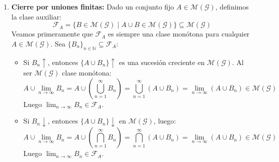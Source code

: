 \begin{demostracion}
\begin{enumerate}
\begin{itemize}
\begin{itemize}
            \item Si $A_n \downarrow$, de manera análoga $\displaystyle \lim_{n \to \infty} A_n = \bigcap_{n=1}^\infty A_n \in \mathcal{M}(\mathcal{G})$, y su complementario $\displaystyle \left( \lim_{n \to \infty} A_n \right)^c = \bigcup_{n=1}^\infty A_n^c = \lim_{n \to \infty} A_n^c \in \mathcal{M}(\mathcal{G})$ (pues $A_n^c \uparrow$ en $\mathcal{M}(\mathcal{G})$). Luego $\lim A_n \in \mathcal{F}$.
        \end{itemize}
    \end{itemize}
    Puesto que $\mathcal{F}$ es una clase monótona que contiene a $\mathcal{G}$, y $\mathcal{M}(\mathcal{G})$ es la minimal entre las clases monótonas que contienen a $\mathcal{G}$, se concluye que $\mathcal{M}(\mathcal{G}) \subseteq \mathcal{F}$. Por ende, $\mathcal{M}(\mathcal{G}) = \mathcal{F}$, lo que demuestra que $\mathcal{M}(\mathcal{G})$ es cerrada por complementarios.

    \item \textbf{Cierre por uniones finitas:}
    Dado un conjunto fijo $A \in \mathcal{M}(\mathcal{G})$, definimos la clase auxiliar:
    \[
        \mathcal{F}_A = \{ B \in \mathcal{M}(\mathcal{G}) \mid A \cup B \in \mathcal{M}(\mathcal{G}) \} \subseteq \mathcal{M}(\mathcal{G})
    \]
    Veamos primeramente que $\mathcal{F}_A$ es siempre una clase monótona para cualquier $A \in \mathcal{M}(\mathcal{G})$. Sea $\{B_n\}_{n \in \mathbb{N}} \subseteq \mathcal{F}_A$:
    \begin{itemize}
        \item Si $B_n \uparrow$, entonces $\{A \cup B_n\} \uparrow$ es una sucesión creciente en $\mathcal{M}(\mathcal{G})$. Al ser $\mathcal{M}(\mathcal{G})$ clase monótona:
        \[
            A \cup \lim_{n \to \infty} B_n = A \cup \left( \bigcup_{n=1}^\infty B_n \right) = \bigcup_{n=1}^\infty (A \cup B_n) = \lim_{n \to \infty} (A \cup B_n) \in \mathcal{M}(\mathcal{G})
        \]
        Luego $\lim_{n \to \infty} B_n \in \mathcal{F}_A$.

        \item Si $B_n \downarrow$, entonces $\{A \cup B_n\} \downarrow$ en $\mathcal{M}(\mathcal{G})$, luego:
        \[
            A \cup \lim_{n \to \infty} B_n = A \cup \left( \bigcap_{n=1}^\infty B_n \right) = \bigcap_{n=1}^\infty (A \cup B_n) = \lim_{n \to \infty} (A \cup B_n) \in \mathcal{M}(\mathcal{G})
        \]
        Luego $\lim_{n \to \infty} B_n \in \mathcal{F}_A$.
    \end{itemize}


\end{enumerate}
\end{demostracion}
